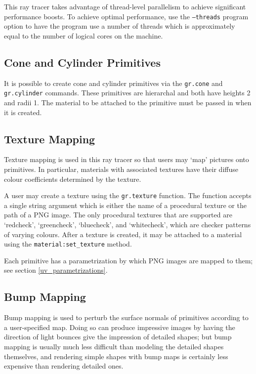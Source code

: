 \documentclass{article}
\begin{document}
This ray tracer takes advantage of thread-level parallelism to achieve
significant performance boosts. To achieve optimal performance, use the
{\tt --threads} program option to have the program use a number of threads which is
approximately equal to the number of logical cores on the machine.

\subsection{Cone and Cylinder Primitives}
\label{primitives}

It is possible to create cone and cylinder primitives via the {\tt gr.cone} and
{\tt gr.cylinder} commands. These primitives are hierarchal and both have heights
2 and radii 1. The material to be attached to the primitive must be passed in
when it is created.

\subsection{Texture Mapping}
\label{texture_mapping}

Texture mapping is used in this ray tracer so that users may `map' pictures onto
primitives. In particular, materials with associated textures have their diffuse
colour coefficients determined by the texture.

A user may create a texture using the {\tt gr.texture} function. The function
accepts a single string argument which is either the name of a procedural
texture or the path of a PNG image. The only procedural textures that are
supported are `redcheck', `greencheck', `bluecheck', and `whitecheck', which are
checker patterns of varying colours. After a texture is created, it may be
attached to a material using the {\tt material:set\_texture} method.

Each primitive has a parametrization by which PNG images are mapped to them; see
section \ref{uv_parametrizations}.


\subsection{Bump Mapping}
\label{bump_mapping}

Bump mapping is used to perturb the surface normals of primitives according to a
user-specified map. Doing so can produce impressive images by having the
direction of light bounces give the impression of detailed shapes; but bump
mapping is usually much less difficult than modeling the detailed shapes
themselves, and rendering simple shapes with bump maps is certainly less
expensive than rendering detailed ones.
\end{document}
